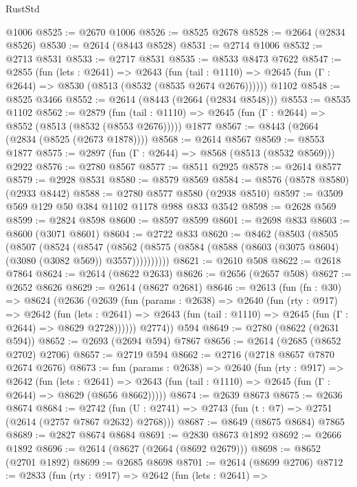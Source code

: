\begin{lexlean}{RustStd}
\begin{coremodule}
    @1006
@8525 := @2670 @1006
@8526 := @8525 @2678
@8528 := @2664 (@2834 @8526)
@8530 := @2614 (@8443 @8528)
@8531 := @2714 @1006
@8532 := @2713 @8531
@8533 := @2717 @8531
@8535 := @8533 @8473 @7622
@8547 := @2855
    (fun (lets : @2641) =>
    @2643
      (fun (tail : @1110) => @2645 (fun (Γ : @2644) => @8530 (@8513 (@8532 (@8535 @2674 @2676))))))
    @1102
@8548 := @8525 @3466
@8552 := @2614 (@8443 (@2664 (@2834 @8548)))
@8553 := @8535 @1102
@8562 := @2879
    (fun (tail : @1110) => @2645 (fun (Γ : @2644) => @8552 (@8513 (@8532 (@8553 @2676)))))
    @1877
@8567 := @8443 (@2664 (@2834 (@8525 (@2673 @1878))))
@8568 := @2614 @8567
@8569 := @8553 @1877
@8575 := @2897 (fun (Γ : @2644) => @8568 (@8513 (@8532 @8569))) @2922
@8576 := @2780 @8567
@8577 := @8511 @2925
@8578 := @2614 @8577
@8579 := @2928 @8531
@8580 := @8579 @8569
@8584 := @8576 (@8578 @8580) (@2933 @8442)
@8588 := @2780 @8577 @8580 (@2938 @8510)
@8597 := @3509 @569 @129 @50 @384 @1102 @1178 @988 @833 @3542
@8598 := @2628 @569
@8599 := @2824 @8598
@8600 := @8597 @8599
@8601 := @2698 @833
@8603 := @8600 (@3071 @8601)
@8604 := @2722 @833
@8620 := @8462
    (@8503
      (@8505
        (@8507
          (@8524
            (@8547
              (@8562 (@8575 (@8584 (@8588 (@8603 (@3075 @8604) (@3080 (@3082 @569)) @3557))))))))))
@8621 := @2610 @508
@8622 := @2618 @7864
@8624 := @2614 (@8622 @2633)
@8626 := @2656 (@2657 @508)
@8627 := @2652 @8626
@8629 := @2614 (@8627 @2681)
@8646 := @2613
    (fun (fn : @30) =>
    @8624
      (@2636
        (@2639
          (fun (params : @2638) =>
          @2640
            (fun (rty : @917) =>
            @2642
              (fun (lets : @2641) =>
              @2643 (fun (tail : @1110) => @2645 (fun (Γ : @2644) => @8629 @2728))))))
        @2774))
    @594
@8649 := @2780 (@8622 (@2631 @594))
@8652 := @2693 (@2694 @594) @7867
@8656 := @2614 (@2685 (@8652 @2702) @2706)
@8657 := @2719 @594
@8662 := @2716 (@2718 @8657 @7870 @2674 @2676)
@8673 := fun (params : @2638) =>
  @2640
    (fun (rty : @917) =>
    @2642
      (fun (lets : @2641) =>
      @2643 (fun (tail : @1110) => @2645 (fun (Γ : @2644) => @8629 (@8656 @8662)))))
@8674 := @2639 @8673
@8675 := @2636 @8674
@8684 := @2742 (fun (U : @2741) => @2743 (fun (t : @7) => @2751 (@2614 (@2757 @7867 @2632) @2768)))
@8687 := @8649 (@8675 @8684) @7865
@8689 := @2827 @8674 @8684
@8691 := @2830 @8673 @1892
@8692 := @2666 @1892
@8696 := @2614 (@8627 (@2664 (@8692 @2679)))
@8698 := @8652 (@2701 @1892)
@8699 := @2685 @8698
@8701 := @2614 (@8699 @2706)
@8712 := @2833
    (fun (rty : @917) =>
    @2642
      (fun (lets : @2641) =>

\end{coremodule}
\end{lexlean}
